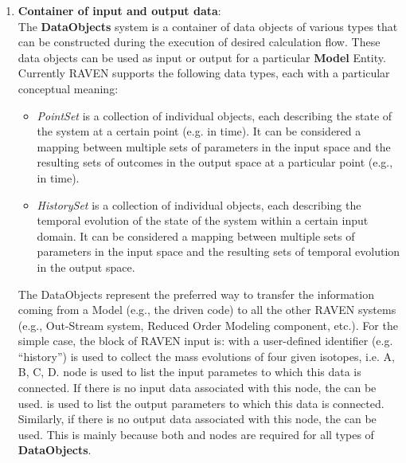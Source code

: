 \begin{enumerate}
   \item \textbf{Container of input and output data}: 
     \\The \textbf{DataObjects} system is a container of data objects of various types that can be constructed
     during the execution of desired calculation flow. These data objects can be used as input or output for a
     particular \textbf{Model} Entity. Currently RAVEN supports the following data types, each with a particular
     conceptual meaning:
     \begin{itemize}
        \item \textit{PointSet} is a collection of individual objects, each describing the state of the system at
                                a certain point (e.g. in time). It can be considered a mapping between multiple
                                            sets of parameters in the input space and the resulting sets of outcomes in the output space
                                            at a particular point (e.g., in time).
        \item \textit{HistorySet} is a collection of individual objects, each describing the temporal evolution of the
                                  state of the system within a certain input domain. It can be considered a mapping between
                                               multiple sets of parameters in the input space and the resulting sets of temporal evolution
                                               in the output space.
     \end{itemize}
     The DataObjects represent the preferred way to transfer the information coming from a Model (e.g., the
     driven code) to all the other RAVEN systems (e.g., Out-Stream system, Reduced Order Modeling component, etc.).
     For the simple case, the  block of RAVEN input is:
      with a user-defined identifier (e.g. ``history'') is used to collect the mass evolutions
     of four given isotopes, i.e. A, B, C, D.  node is used to list the input parametes to which
     this data is connected. If there is no input data associated with this node, the 
     can be used.  is used to list the output parameters to which this data is connected. Similarly,
     if there is no output data associated with this node, the  can be used. This is
     mainly because both  and  nodes are required for all types of \textbf{DataObjects}.


\end{enumerate}
